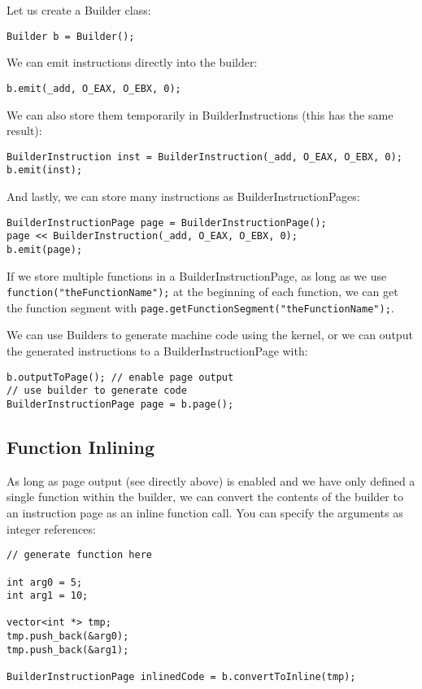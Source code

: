 \documentclass[10pt,a4paper]{article}
\begin{document}
Let us create a Builder class:
\begin{verbatim}
Builder b = Builder();
\end{verbatim}

We can emit instructions directly into the builder:
\begin{verbatim}
b.emit(_add, O_EAX, O_EBX, 0);
\end{verbatim}

We can also store them temporarily in BuilderInstructions (this has the same result):
\begin{verbatim}
BuilderInstruction inst = BuilderInstruction(_add, O_EAX, O_EBX, 0);
b.emit(inst);
\end{verbatim}

And lastly, we can store many instructions as BuilderInstructionPages:
\begin{verbatim}
BuilderInstructionPage page = BuilderInstructionPage();
page << BuilderInstruction(_add, O_EAX, O_EBX, 0);
b.emit(page);
\end{verbatim}

If we store multiple functions in a BuilderInstructionPage, as long as we use \verb|function("theFunctionName");| at the beginning of each function, we can get the function segment with \verb|page.getFunctionSegment("theFunctionName");|.

We can use Builders to generate machine code using the kernel, or we can output the generated instructions to a BuilderInstructionPage with:
\begin{verbatim}
b.outputToPage(); // enable page output
// use builder to generate code
BuilderInstructionPage page = b.page();
\end{verbatim}

\subsection{Function Inlining}
As long as page output (see directly above) is enabled and we have only defined a single function within the builder, we can convert the contents of the builder to an instruction page  as an inline function call. You can specify the arguments as integer references:
\begin{verbatim}
// generate function here

int arg0 = 5;
int arg1 = 10;

vector<int *> tmp;
tmp.push_back(&arg0);
tmp.push_back(&arg1);

BuilderInstructionPage inlinedCode = b.convertToInline(tmp);
\end{verbatim}
\end{document}
